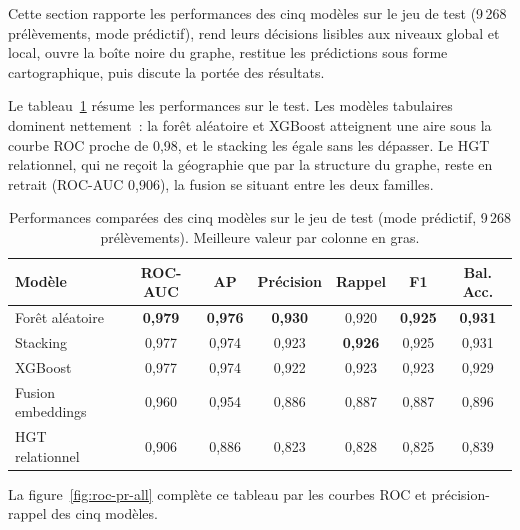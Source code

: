 \label{sec:contrib-resultats}

Cette section rapporte les performances des cinq mod\`eles sur le jeu de test (9\,268 pr\'el\`evements, mode pr\'edictif), rend leurs d\'ecisions lisibles aux niveaux global et local, ouvre la bo\^ite noire du graphe, restitue les pr\'edictions sous forme cartographique, puis discute la port\'ee des r\'esultats.

\label{sec:contrib-perf}

Le tableau~\ref{tab:comparaison-modeles-chap3} r\'esume les performances sur le test. Les mod\`eles tabulaires dominent nettement~: la for\^et al\'eatoire et XGBoost atteignent une aire sous la courbe ROC proche de 0,98, et le stacking les \'egale sans les d\'epasser. Le HGT relationnel, qui ne re\c{c}oit la g\'eographie que par la structure du graphe, reste en retrait (ROC-AUC 0,906), la fusion se situant entre les deux familles.

\begin{table}[h!]
    \centering
    \caption{Performances compar\'ees des cinq mod\`eles sur le jeu de test (mode pr\'edictif, 9\,268 pr\'el\`evements). Meilleure valeur par colonne en gras.}
    \label{tab:comparaison-modeles-chap3}
    \begin{tabular}{lcccccc}
        \hline
        Mod\`ele & ROC-AUC & AP & Pr\'ecision & Rappel & F1 & Bal. Acc. \\
        \hline
        For\^et al\'eatoire & \textbf{0,979} & \textbf{0,976} & \textbf{0,930} & 0,920 & \textbf{0,925} & \textbf{0,931} \\
        Stacking         & 0,977 & 0,974 & 0,923 & \textbf{0,926} & 0,925 & 0,931 \\
        XGBoost          & 0,977 & 0,974 & 0,922 & 0,923 & 0,923 & 0,929 \\
        Fusion embeddings & 0,960 & 0,954 & 0,886 & 0,887 & 0,887 & 0,896 \\
        HGT relationnel  & 0,906 & 0,886 & 0,823 & 0,828 & 0,825 & 0,839 \\
        \hline
    \end{tabular}
\end{table}

La figure~\ref{fig:roc-pr-all} compl\`ete ce tableau par les courbes ROC et pr\'ecision-rappel des cinq mod\`eles.

